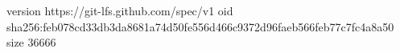 version https://git-lfs.github.com/spec/v1
oid sha256:feb078cd33db3da8681a74d50fe556d466c9372d96faeb566feb77c7fc4a8a50
size 36666

